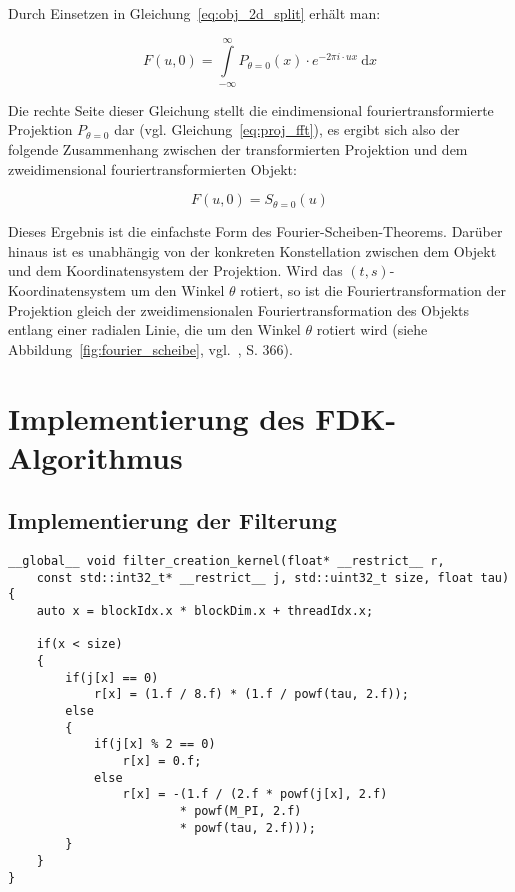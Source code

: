 Durch Einsetzen in Gleichung~\ref{eq:obj_2d_split} erhält man:

\begin{equation}
    F(u, 0) = \int\limits_{-\infty}^{\infty} P_{\theta = 0}(x) \cdot e^{-2 \pi i \cdot u x}\ \mathrm{d} x
\end{equation}

Die rechte Seite dieser Gleichung stellt die eindimensional fouriertransformierte Projektion $P_{\theta = 0}$ dar (vgl.
Gleichung~\ref{eq:proj_fft}), es ergibt sich also der folgende Zusammenhang zwischen der transformierten Projektion und
dem zweidimensional fouriertransformierten Objekt:

\begin{equation}
    F(u, 0) = S_{\theta = 0}(u)
\end{equation}

Dieses Ergebnis ist die einfachste Form des Fourier-Scheiben-Theorems. Darüber hinaus ist es unabhängig von der
konkreten Konstellation zwischen dem Objekt und dem Koordinatensystem der Projektion. Wird das
$(t, s)$-Koordinatensystem um den Winkel $\theta$ rotiert, so ist die Fouriertransformation der Projektion gleich der
zweidimensionalen Fouriertransformation des Objekts entlang einer radialen Linie, die um den Winkel $\theta$ rotiert
wird (siehe Abbildung~\ref{fig:fourier_scheibe}, vgl.~\cite{rosenkak}, S. 366).

\chapter{Implementierung des FDK-Algorithmus}

\section{Implementierung der Filterung}

\begin{code}
\begin{verbatim}
__global__ void filter_creation_kernel(float* __restrict__ r,
    const std::int32_t* __restrict__ j, std::uint32_t size, float tau)
{
    auto x = blockIdx.x * blockDim.x + threadIdx.x;

    if(x < size)
    {
        if(j[x] == 0)
            r[x] = (1.f / 8.f) * (1.f / powf(tau, 2.f));
        else
        {
            if(j[x] % 2 == 0)
                r[x] = 0.f;
            else
                r[x] = -(1.f / (2.f * powf(j[x], 2.f)
                        * powf(M_PI, 2.f)
                        * powf(tau, 2.f)));
        }
    }
}
\end{verbatim}
\label{app:filter_gen}
\end{code}

